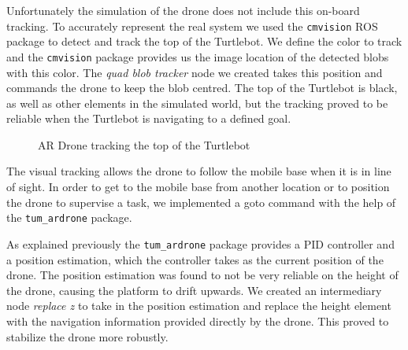 \documentclass[11pt,a4paper]{article}
\begin{document}
Unfortunately the simulation of the drone does not include this on-board tracking. To accurately represent the real system we used the \verb!cmvision! ROS package to detect and track the top of the Turtlebot. We define the color to track and the \verb!cmvision! package provides us the image location of the detected blobs with this color. The \textit{quad blob tracker} node we created takes this position and commands the drone to keep the blob centred. The top of the Turtlebot is black, as well as other elements in the simulated world, but the tracking proved to be reliable when the Turtlebot is navigating to a defined goal.


\begin{figure}[ht!]%
	\centering
    \qquad  
    \caption{AR Drone tracking the top of the Turtlebot}
    \label{fig:simTracking}
\end{figure}


The visual tracking allows the drone to follow the mobile base when it is in line of sight. In order to get to the mobile base from another location or to position the drone to supervise a task, we implemented a goto command with the help of the \verb!tum_ardrone! package.

As explained previously the \verb!tum_ardrone! package provides a PID controller and a position estimation, which the controller takes as the current position of the drone. The position estimation was found to not be very reliable on the height of the drone, causing the platform to drift upwards. We created an intermediary node \textit{replace z} to take in the position estimation and replace the height element with the navigation information provided directly by the drone. This proved to stabilize the drone more robustly.
\end{document}

